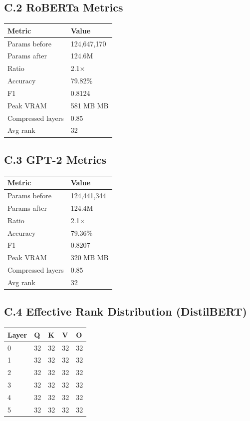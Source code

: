 \subsection{C.2 RoBERTa Metrics}

\begin{table}[H]
\centering
\small
\begin{tabular}{ll}
\toprule
\textbf{Metric} & \textbf{Value} \\
\midrule
Params before & 124,647,170 \\
Params after & 124.6M \\
Ratio & 2.1$\times$ \\
Accuracy & 79.82\% \\
F1 & 0.8124 \\
Peak VRAM & 581 MB MB \\
Compressed layers & 0.85 \\
Avg rank & 32 \\
\bottomrule
\end{tabular}
\end{table}

\subsection{C.3 GPT-2 Metrics}

\begin{table}[H]
\centering
\small
\begin{tabular}{ll}
\toprule
\textbf{Metric} & \textbf{Value} \\
\midrule
Params before & 124,441,344 \\
Params after & 124.4M \\
Ratio & 2.1$\times$ \\
Accuracy & 79.36\% \\
F1 & 0.8207 \\
Peak VRAM & 320 MB MB \\
Compressed layers & 0.85 \\
Avg rank & 32 \\
\bottomrule
\end{tabular}
\end{table}

\subsection{C.4 Effective Rank Distribution (DistilBERT)}

\begin{table}[H]
\centering
\small
\begin{tabular}{lllll}
\toprule
\textbf{Layer} & \textbf{Q} & \textbf{K} & \textbf{V} & \textbf{O} \\
\midrule
0 & 32 & 32 & 32 & 32 \\
1 & 32 & 32 & 32 & 32 \\
2 & 32 & 32 & 32 & 32 \\
3 & 32 & 32 & 32 & 32 \\
4 & 32 & 32 & 32 & 32 \\
5 & 32 & 32 & 32 & 32 \\
\bottomrule
\end{tabular}
\end{table}

